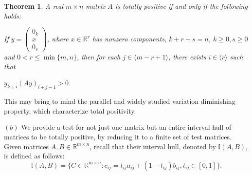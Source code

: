 \documentclass[11pt]{article}
\newtheorem{utheorem}{\textrm{\textbf{Theorem}}}
\begin{document}
 \begin{utheorem}\label{tp-sign-rev}
 	A real $m \times n $ matrix $A$ is totally positive if and only if the following holds:
 	
 	If $y=\begin{pmatrix} 0_k\\x\\0_s \end{pmatrix}$, where  $x \in \mathbb{R}^r$ has nonzero components, $k + r + s = n$, $k \geq 0, s \geq  0$ and $0<r \leq \min\{m, n\}$, then for each $j \in \langle m-r+1 \rangle$, there exists $i \in \langle r \rangle$ such that \begin{center} $y_{k+i}(Ay)_{i+j-1} > 0$.\end{center}
 	
 \end{utheorem}
This may bring to mind the parallel and widely studied variation diminishing property, which characterize total positivity.

$(b)$ We provide a test for not just one matrix but an entire interval
hull of matrices to be totally positive, by reducing it to a finite set
of test matrices. Given matrices $A, B \in \mathbb{R}^{m \times n}$,
recall that their interval hull, denoted by  $\mathbb{I}(A,B)$, is
defined as follows:
\begin{equation}
	\mathbb{I}(A,B) = \{C \in \mathbb{R}^{m \times n}: c_{ij} = t_{ij} a_{ij} + (1 - t_{ij}) b_{ij}, t_{ij} \in [0,1]\} \label{hulleqn}.
\end{equation}
\end{document}
